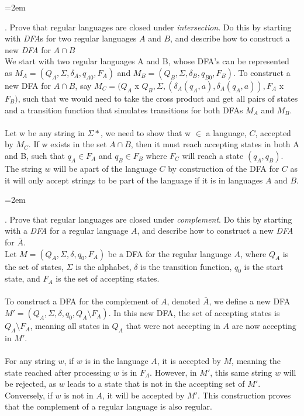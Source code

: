 \documentclass[12pt]{article}
\newcounter{quesnum}
\newcommand{\question}[2][??]{
\begin{list}{\labelitemi}{\leftmargin=2em}
\item [\arabic{quesnum}.] {} {#2}
\end{list}
\addtocounter{quesnum}{1}
}
\begin{document}
\question[3]{
Prove that regular languages are closed under \emph{intersection}. Do this by starting with \emph{DFA}s for two regular languages $A$ and $B$, and describe how to construct a new \emph{DFA} for $A \cap B$\
\\

We start with two regular languages A and B, whose DFA's can be represented as $M_A = (Q_A, \Sigma, \delta_A, q_{A0}, F_A)$ and $M_B = (Q_B, \Sigma, \delta_B, q_{B0}, F_B)$. To construct a new DFA for $A \cap B$, say $M_C = (Q_A $ x $ Q_B, \Sigma, (\delta_A(q_A,a),\delta_A(q_A,a)) ,F_A $ x $ F_B)$, such that we would need to take the cross product and get all pairs of states and a transition function that simulates transitions for both DFAs $M_A $ and $ M_B$.\\
\\
Let w be any string in $\Sigma*$, we need to show that w $\in$ a language, $C$, accepted by $M_C$. If w exists in the set $A \cap B$, then it must reach accepting states in both A and B, such that $q_A \in F_A$ and $q_B \in F_B$ where $F_C$ will reach a state $(q_A, q_B)$. The string $w$ will be apart of the language $C$ by construction of the DFA for $C$ as it will only accept strings to be part of the language if it is in languages $A$ and $B$.
}


\vspace{12pt}

\question[3]{
Prove that regular languages are closed under \emph{complement}. Do this by starting with a \emph{DFA} for a regular language $A$, and describe how to construct a new \emph{DFA} for $\bar{A}$.
\\

Let $M = (Q_A, \Sigma, \delta, q_0, F_A)$ be a DFA for the regular language $A$, where $Q_A$ is the set of states, $\Sigma$ is the alphabet, $\delta$ is the transition function, $q_0$ is the start state, and $F_A$ is the set of accepting states.\\
\\
To construct a DFA for the complement of $A$, denoted $\bar{A}$, we define a new DFA $M' = (Q_A, \Sigma, \delta, q_0, Q_A \setminus F_A)$. In this new DFA, the set of accepting states is $Q_A \setminus F_A$, meaning all states in $Q_A$ that were not accepting in $A$ are now accepting in $M'$.\\
\\
For any string $w$, if $w$ is in the language $A$, it is accepted by $M$, meaning the state reached after processing $w$ is in $F_A$. However, in $M'$, this same string $w$ will be rejected, as $w$ leads to a state that is not in the accepting set of $M'$. Conversely, if $w$ is not in $A$, it will be accepted by $M'$. This construction proves that the complement of a regular language is also regular.
}
\end{document}
